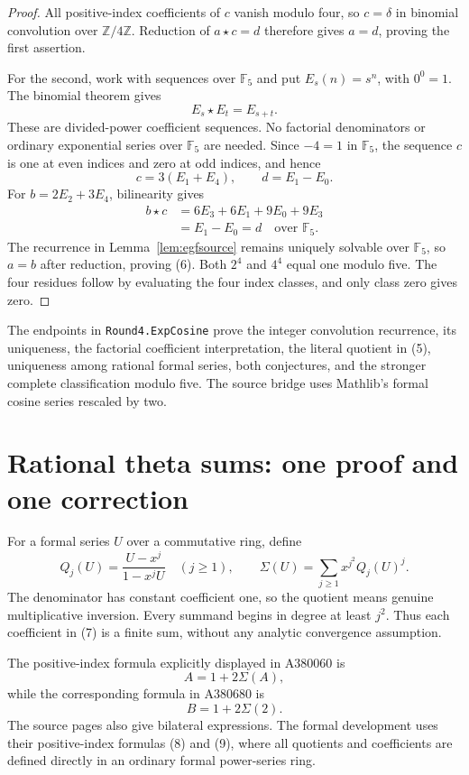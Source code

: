 \documentclass[11pt,a4paper]{article}
\theoremstyle{remark}
\newcommand{\Z}{\mathbb Z}
\newcommand{\F}{\mathbb F}
\begin{document}
\begin{proof}
All positive-index coefficients of $c$ vanish modulo four, so $c=\delta$
in binomial convolution over $\Z/4\Z$. Reduction of $a\star c=d$
therefore gives $a=d$, proving the first assertion.

For the second, work with sequences over $\F_5$ and put $E_s(n)=s^n$,
with $0^0=1$. The binomial theorem gives
\[
 E_s\star E_t=E_{s+t}.
\]
These are divided-power coefficient sequences. No factorial denominators
or ordinary exponential series over $\F_5$ are needed. Since $-4=1$ in
$\F_5$, the sequence $c$ is one at even indices and zero at odd indices,
and hence
\[
 c=3(E_1+E_4),\qquad d=E_1-E_0.
\]
For $b=2E_2+3E_4$, bilinearity gives
\[
 \begin{aligned}
 b\star c
 &=6E_3+6E_1+9E_0+9E_3\\
 &=E_1-E_0=d
 \quad\text{over }\F_5.
 \end{aligned}
\]
The recurrence in Lemma~\ref{lem:egfsource} remains uniquely solvable
over $\F_5$, so $a=b$ after reduction, proving (6). Both $2^4$ and $4^4$
equal one modulo five. The four residues follow by evaluating the four
index classes, and only class zero gives zero.
\end{proof}

The endpoints in \texttt{Round4.ExpCosine} prove the integer convolution
recurrence, its uniqueness, the factorial coefficient interpretation,
the literal quotient in (5), uniqueness among rational formal series,
both conjectures, and the stronger complete classification modulo five.
The source bridge uses Mathlib's formal cosine series rescaled by two.

\section{Rational theta sums: one proof and one correction}\label{sec:theta}

For a formal series $U$ over a commutative ring, define
\[
 Q_j(U)=\frac{U-x^j}{1-x^jU}\quad(j\ge1),\qquad
 \Sigma(U)=\sum_{j\ge1}x^{j^2}Q_j(U)^j. \tag{7}
\]
The denominator has constant coefficient one, so the quotient means
genuine multiplicative inversion. Every summand begins in degree at
least $j^2$. Thus each coefficient in (7) is a finite sum, without any
analytic convergence assumption.

The positive-index formula explicitly displayed in A380060 is
\cite{oeis060}
\[
 A=1+2\Sigma(A), \tag{8}
\]
while the corresponding formula in A380680 is \cite{oeis680}
\[
 B=1+2\Sigma(2). \tag{9}
\]
The source pages also give bilateral expressions. The formal development
uses their positive-index formulas (8) and (9), where all quotients and
coefficients are defined directly in an ordinary formal power-series
ring.
\end{document}
